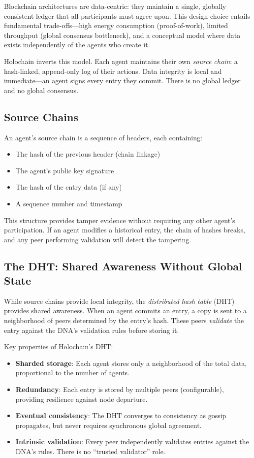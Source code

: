 \documentclass[12pt]{book}
\begin{document}
Blockchain architectures are data-centric: they maintain a single, globally
consistent ledger that all participants must agree upon. This design choice
entails fundamental trade-offs---high energy consumption (proof-of-work),
limited throughput (global consensus bottleneck), and a conceptual model where
data exists independently of the agents who create it.

Holochain inverts this model. Each agent maintains their own \emph{source chain}:
a hash-linked, append-only log of their actions. Data integrity is local and
immediate---an agent signs every entry they commit. There is no global ledger
and no global consensus.

\subsection{Source Chains}

An agent's source chain is a sequence of headers, each containing:

\begin{itemize}
  \item The hash of the previous header (chain linkage)
  \item The agent's public key signature
  \item The hash of the entry data (if any)
  \item A sequence number and timestamp
\end{itemize}

This structure provides tamper evidence without requiring any other agent's
participation. If an agent modifies a historical entry, the chain of hashes
breaks, and any peer performing validation will detect the tampering.

\subsection{The DHT: Shared Awareness Without Global State}

While source chains provide local integrity, the \emph{distributed hash table}
(DHT) provides shared awareness. When an agent commits an entry, a copy is
sent to a neighborhood of peers determined by the entry's hash. These peers
\emph{validate} the entry against the DNA's validation rules before storing it.

Key properties of Holochain's DHT:

\begin{itemize}
  \item \textbf{Sharded storage}: Each agent stores only a neighborhood of the
    total data, proportional to the number of agents.
  \item \textbf{Redundancy}: Each entry is stored by multiple peers (configurable),
    providing resilience against node departure.
  \item \textbf{Eventual consistency}: The DHT converges to consistency as gossip
    propagates, but never requires synchronous global agreement.
  \item \textbf{Intrinsic validation}: Every peer independently validates entries
    against the DNA's rules. There is no ``trusted validator'' role.
\end{itemize}
\end{document}
